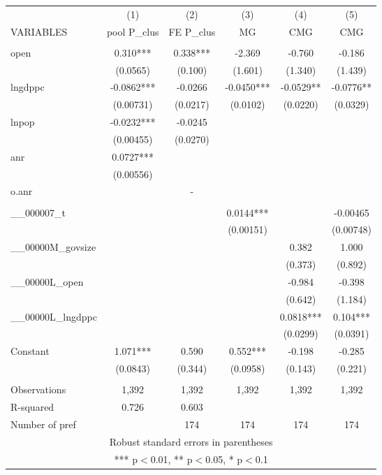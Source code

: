 \documentclass[]{article}
\begin{document}
\begin{tabular}{lccccc} \hline
 & (1) & (2) & (3) & (4) & (5) \\
VARIABLES & pool P\_clus & FE P\_clus & MG & CMG & CMG \\ \hline
 &  &  &  &  &  \\
open & 0.310*** & 0.338*** & -2.369 & -0.760 & -0.186 \\
 & (0.0565) & (0.100) & (1.601) & (1.340) & (1.439) \\
lngdppc & -0.0862*** & -0.0266 & -0.0450*** & -0.0529** & -0.0776** \\
 & (0.00731) & (0.0217) & (0.0102) & (0.0220) & (0.0329) \\
lnpop & -0.0232*** & -0.0245 &  &  &  \\
 & (0.00455) & (0.0270) &  &  &  \\
anr & 0.0727*** &  &  &  &  \\
 & (0.00556) &  &  &  &  \\
o.anr &  & - &  &  &  \\
 &  &  &  &  &  \\
\_\_000007\_t &  &  & 0.0144*** &  & -0.00465 \\
 &  &  & (0.00151) &  & (0.00748) \\
\_\_00000M\_govsize &  &  &  & 0.382 & 1.000 \\
 &  &  &  & (0.373) & (0.892) \\
\_\_00000L\_open &  &  &  & -0.984 & -0.398 \\
 &  &  &  & (0.642) & (1.184) \\
\_\_00000L\_lngdppc &  &  &  & 0.0818*** & 0.104*** \\
 &  &  &  & (0.0299) & (0.0391) \\
Constant & 1.071*** & 0.590 & 0.552*** & -0.198 & -0.285 \\
 & (0.0843) & (0.344) & (0.0958) & (0.143) & (0.221) \\
 &  &  &  &  &  \\
Observations & 1,392 & 1,392 & 1,392 & 1,392 & 1,392 \\
R-squared & 0.726 & 0.603 &  &  &  \\
 Number of pref &  & 174 & 174 & 174 & 174 \\ \hline
\multicolumn{6}{c}{ Robust standard errors in parentheses} \\
\multicolumn{6}{c}{ *** p$<$0.01, ** p$<$0.05, * p$<$0.1} \\
\end{tabular}
\end{document}
